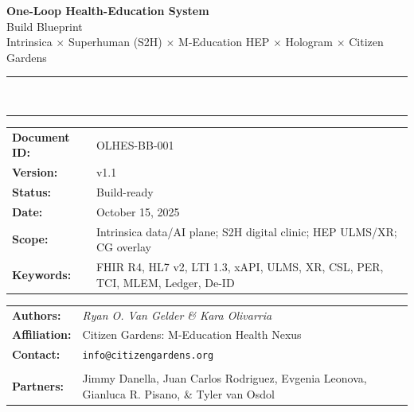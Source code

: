 \documentclass[11pt]{article}
\theoremstyle{plain}
\begin{document}
\begin{titlepage}
  \centering


  {\Large\textbf{One-Loop Health-Education System}}\\[6pt]
  {\large Build Blueprint}\\[10pt]
  {\normalsize Intrinsica \(\times\) Superhuman (S2H) \(\times\) M-Education HEP \(\times\) Hologram \(\times\) Citizen Gardens}\\[20pt]

  \rule{\textwidth}{0.4pt}\\[-4pt]
  \rule{\textwidth}{1.2pt}

  \vspace{1.2cm}

  \begin{tabular}{>{\bfseries}p{3.2cm} p{10.5cm}}
    Document ID: & OLHES-BB-001 \\
    Version:     & v1.1 \\
    Status:      & Build-ready \\
    Date:        & October 15, 2025 \\
    Scope:       & Intrinsica data/AI plane; S2H digital clinic; HEP ULMS/XR; CG overlay \\
    Keywords:    & FHIR R4, HL7 v2, LTI 1.3, xAPI, ULMS, XR, CSL, PER, TCI, MLEM, Ledger, De-ID \\
  \end{tabular}

  \vfill

  \begin{tabular}{>{\bfseries}p{3.2cm} p{10.5cm}}
    Authors:     & \textit{Ryan O. Van Gelder \& Kara Olivarria} \\
    Affiliation: & Citizen Gardens: M-Education Health Nexus \\
    Contact:     & \texttt{info@citizengardens.org} \\ \\
    Partners:   &    Jimmy Danella, Juan Carlos Rodriguez,  Evgenia Leonova, Gianluca R. Pisano, \& Tyler van Osdol \\
  \end{tabular}


\end{titlepage}
\end{document}
